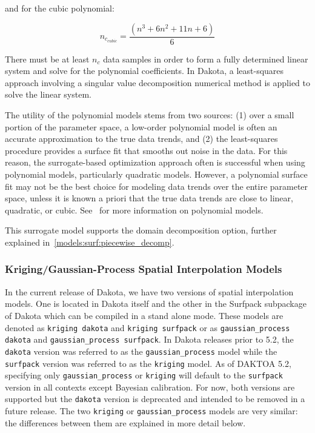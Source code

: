 and for the cubic polynomial:

\begin{equation}
  n_{c_{cubic}}=\frac{(n^{3}+6 n^{2}+11 n+6)}{6}
  \label{models:surf:equation06}
\end{equation}

There must be at least $n_{c}$ data samples in order to form a fully
determined linear system and solve for the polynomial coefficients. In
Dakota, a least-squares approach involving a singular value
decomposition numerical method is applied to solve the linear system.

The utility of the polynomial models stems from two sources: (1) over
a small portion of the parameter space, a low-order polynomial model
is often an accurate approximation to the true data trends, and (2)
the least-squares procedure provides a surface fit that smooths out
noise in the data. For this reason, the surrogate-based optimization
approach often is successful when using polynomial models,
particularly quadratic models. However, a polynomial surface fit may
not be the best choice for modeling data trends over the entire
parameter space, unless it is known a priori that the true data trends
are close to linear, quadratic, or cubic. See~\cite{Mye95} for more
information on polynomial models.

This surrogate model supports the domain decomposition option, further explained in~\ref{models:surf:piecewise_decomp}.

\subsubsection{Kriging/Gaussian-Process Spatial Interpolation Models}
\label{models:surf:kriging}
In the current release of Dakota, we have two versions of spatial interpolation 
models. One is located in Dakota itself and the other in the Surfpack subpackage 
of Dakota which can be compiled in a stand alone mode.  These models
are denoted as \texttt{kriging dakota} and \texttt{kriging surfpack} or 
as \texttt{gaussian\_process dakota} and 
\texttt{gaussian\_process surfpack}.  In Dakota releases prior to 5.2, the 
\texttt{dakota} version was referred to as the \texttt{gaussian\_process} 
model while the \texttt{surfpack} version was referred to as the 
\texttt{kriging} model.  As of DAKTOA 5.2, specifying only 
\texttt{gaussian\_process} or \texttt{kriging} will default to the
\texttt{surfpack} version in all contexts except Bayesian calibration.  
For now, both versions are supported but the \texttt{dakota} version is 
deprecated and intended to be removed in a future release.  The two 
\texttt{kriging} or \texttt{gaussian\_process} models are very similar: 
the differences between them are explained in more detail below.

